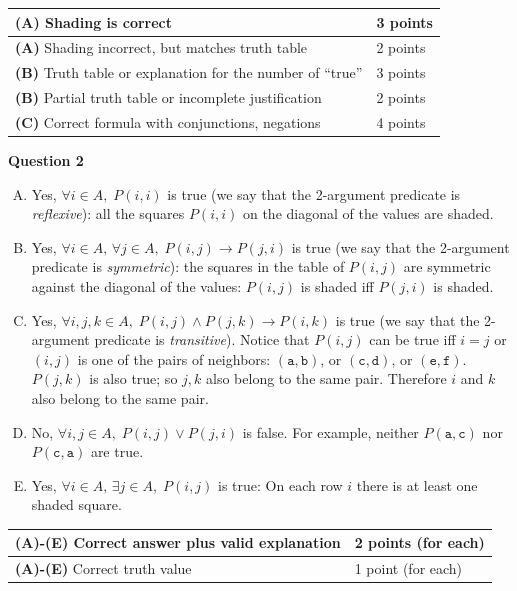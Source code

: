 \documentclass[jou]{apa6}
\begin{document}
{\footnotesize
\begin{tabular}{|l|l|} \hline
{\bf (A)} Shading is correct & 3 points \\ \hline
{\bf (A)} Shading incorrect, but matches truth table & 2 points \\ \hline
{\bf (B)} Truth table or explanation for the number of ``true'' & 3 points \\ \hline
{\bf (B)} Partial truth table or incomplete justification & 2 points \\ \hline
{\bf (C)} Correct formula with conjunctions, negations & 4 points \\ \hline
\end{tabular}
}




\vspace{10pt}
{\bf Question 2}
\begin{enumerate}[(A)]
\item Yes, $\forall i \in A,\;P(i,i)$ is true (we say that the 2-argument predicate 
is {\em reflexive}): all the squares $P(i,i)$ on the diagonal of the values are shaded. 
\item Yes, $\forall i \in A,\,\forall j \in A,\;P(i,j) \rightarrow P(j,i)$ is true (we say that the 2-argument predicate 
is {\em symmetric}): the squares in the table of $P(i,j)$ are symmetric against
the diagonal of the values: $P(i,j)$ is shaded iff $P(j,i)$ is shaded.
\item Yes, $\forall i,j,k \in A,\;P(i,j) \wedge P(j,k) \rightarrow P(i,k)$ is true 
(we say that the 2-argument predicate 
is {\em transitive}). Notice that $P(i,j)$ can be true iff $i=j$ or $(i,j)$ is 
one of the pairs of neighbors: $(\mathtt{a},\mathtt{b})$, or $(\mathtt{c},\mathtt{d})$, or $(\mathtt{e},\mathtt{f})$.
$P(j,k)$ is also true; so $j,k$ also belong to the same pair. Therefore $i$ and $k$ also belong to the same pair. 
\item No, $\forall i,j \in A,\;P(i,j) \vee P(j,i)$ is false. For example, neither $P(\mathtt{a},\mathtt{c})$
nor $P(\mathtt{c},\mathtt{a})$ are true.
\item Yes, $\forall i \in A,\, \exists j \in A,\;P(i,j)$ is true: On each row $i$ there is at least
one shaded square.
\end{enumerate}

{\footnotesize
\begin{tabular}{|l|l|} \hline
{\bf (A)-(E)} Correct answer plus valid explanation & 2 points (for each) \\ \hline
{\bf (A)-(E)} Correct truth value & 1 point (for each) \\ \hline
\end{tabular}
}
\end{document}
